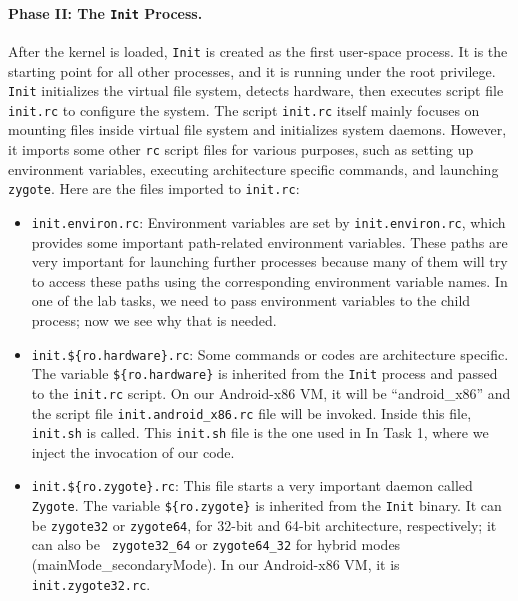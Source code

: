 \paragraph{Phase II: The \texttt{Init} Process.}
After the kernel is loaded, \texttt{Init} is created as the first user-space process. It is the starting
point for all other processes, and it is running under the root privilege. 
\texttt{Init} initializes the virtual file system, detects hardware, 
then executes script file \texttt{init.rc} to configure the system.
The script \texttt{init.rc} itself mainly focuses on mounting files inside virtual file system and
initializes system daemons. However, it imports some other \texttt{rc} script files for various
purposes, such as setting up environment variables, executing architecture specific commands,
and launching \texttt{zygote}. Here are the files imported to \texttt{init.rc}: 

\begin{itemize}
  \item \texttt{init.environ.rc}: Environment variables are set by \texttt{init.environ.rc},
    which provides some important path-related environment variables.  These paths are very
    important for launching further processes because many of them will try to access these
    paths using the corresponding environment variable names. In one
    of the lab tasks, we need to pass environment variables to the child process; now we see
    why that is needed.  

  \item \texttt{init.\$\{ro.hardware\}.rc}: Some commands or codes are architecture specific.
    The variable \texttt{\$\{ro.hardware\}} is inherited from the \texttt{Init} process and passed to 
    the \texttt{init.rc} script. On our Android-x86 VM, it will be ``android\_x86'' and the
    script file \texttt{init.android\_x86.rc} file will be invoked. 
    Inside this file, \texttt{init.sh} is called. This \texttt{init.sh} file
    is the one used in In Task 1, where we inject the invocation of our code.

  \item \texttt{init.\$\{ro.zygote\}.rc}: This file starts a very important daemon called
    \texttt{Zygote}.  The variable \texttt{\$\{ro.zygote\}} is inherited
    from the \texttt{Init} binary. It can be \texttt{zygote32} or \texttt{zygote64}, for 32-bit
    and 64-bit architecture, respectively; it can also be \texttt{ zygote32\_64} or \texttt{zygote64\_32} 
    for hybrid modes (mainMode\_secondaryMode).  In our Android-x86 VM, 
    it is \texttt{init.zygote32.rc}.  
    
    
\end{itemize}


